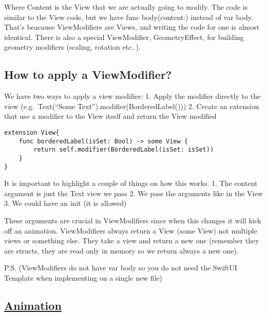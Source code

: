 \documentclass[]{article}
\begin{document}
Where Content is the View that we are actually going to modify. The code
is similar to the View code, but we have func body(content:) instead of
var body. That's beacause ViewModifiers are Views, and writing the code
for one is almost identical. There is also a special ViewModifier,
GeometryEffect, for building geometry modifiers (scaling, rotation
etc..).

\hypertarget{how-to-apply-a-viewmodifier}{%
\subsection{How to apply a
ViewModifier?}\label{how-to-apply-a-viewmodifier}}

We have two ways to apply a view modifier: 1. Apply the modifier
directly to the view (e.g.~Text(``Some
Text'').modifier(BorderedLabel())) 2. Create an extension that use a
modifier to the View itself and return the View modified

\begin{verbatim}
extension View{
    func borderedLabel(isSet: Bool) -> some View {
        return self.modifier(BorderedLabel(isSet: isSet))
    }
}
\end{verbatim}

It is important to highlight a couple of things on how this works. 1.
The content argument is just the Text view we pass 2. We pass the
arguments like in the View 3. We could have an init (it is allowed)

These arguments are crucial in ViewModifiers since when this changes it
will kick off an animation. ViewModifiers always return a View (some
View) not multiple views or something else. They take a view and return
a new one (remember they are structs, they are read only in memory so we
return always a new one).

P.S. (ViewModifiers do not have var body so you do not need the SwiftUI
Template when implementing on a single new file)

\hypertarget{animation-1}{%
\subsection{\texorpdfstring{\href{https://www.youtube.com/watch?v=PoeaUMGAx6c}{Animation}}{Animation}}\label{animation-1}}
\end{document}
